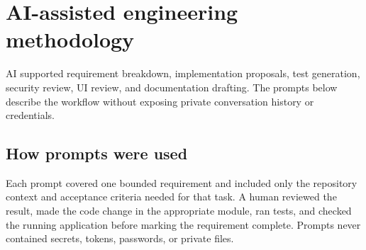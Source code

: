 \documentclass[11pt,a4paper]{article}
\begin{document}
\section{AI-assisted engineering methodology}
AI supported requirement breakdown, implementation proposals, test generation, security review, UI review, and documentation drafting. The prompts below describe the workflow without exposing private conversation history or credentials.

\subsection{How prompts were used}
Each prompt covered one bounded requirement and included only the repository context and acceptance criteria needed for that task. A human reviewed the result, made the code change in the appropriate module, ran tests, and checked the running application before marking the requirement complete. Prompts never contained secrets, tokens, passwords, or private files.
\end{document}
